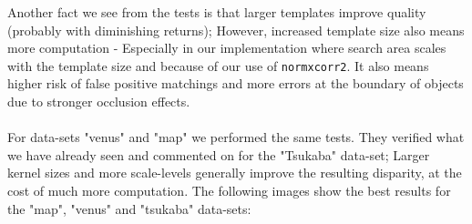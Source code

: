 \documentclass[12pt,a4paper,oneside,final]{article}
\begin{document}
\fi
Another fact we see from the tests is that larger templates improve quality (probably with diminishing returns); However, increased template size also means more computation - Especially in our implementation where search area scales with the template size and because of our use of \texttt{normxcorr2}. It also means higher risk of false positive matchings and more errors at the boundary of objects due to stronger occlusion effects.\\\\

For data-sets "venus" and "map" we performed the same tests. They verified what we have already seen and commented on for the "Tsukaba" data-set; Larger kernel sizes and more scale-levels generally improve the resulting disparity, at the cost of much more computation. The following images show the best results for the "map", "venus" and "tsukaba" data-sets:
\end{document}
